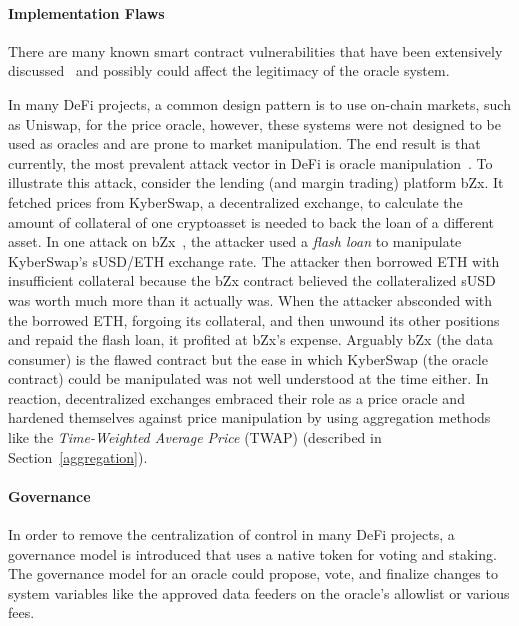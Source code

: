 
\paragraph{Implementation Flaws}
There are many known smart contract vulnerabilities that have been extensively discussed~\cite{attacksonethereum,chen2020survey} and possibly could affect the legitimacy of the oracle system. 

In many DeFi projects, a common design pattern is to use on-chain markets, such as Uniswap, for the price oracle, however, these systems were not designed to be used as oracles and are prone to market manipulation. The end result is that currently, the most prevalent attack vector in DeFi is oracle manipulation~\cite{defiattacksreport}. To illustrate this attack, consider the lending (and margin trading) platform bZx. It fetched prices from KyberSwap, a decentralized exchange, to calculate the amount of collateral of one cryptoasset is needed to back the loan of a different asset. In one attack on bZx~\cite{bzxPeckShield}, the attacker used a \textit{flash loan} to manipulate KyberSwap's sUSD/ETH exchange rate. The attacker then borrowed ETH with insufficient collateral because the bZx contract believed the collateralized sUSD was worth much more than it actually was. When the attacker absconded with the borrowed ETH, forgoing its collateral, and then unwound its other positions and repaid the flash loan, it profited at bZx's expense. Arguably bZx (the data consumer) is the flawed contract but the ease in which KyberSwap (the oracle contract) could be manipulated was not well understood at the time either. In reaction, decentralized exchanges embraced their role as a price oracle and hardened themselves against price manipulation by using aggregation methods like the \textit{Time-Weighted Average Price} (TWAP) (described in Section~\ref{aggregation}). 

\paragraph{Governance} %
In order to remove the centralization of control in many DeFi projects, a governance model is introduced that uses a native token for voting and staking. The governance model for an oracle could propose, vote, and finalize changes to system variables like the approved data feeders on the oracle's allowlist or various fees. 

